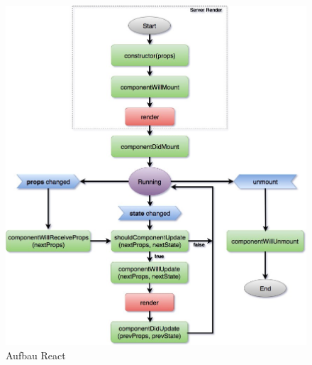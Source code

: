 \begin{figure}[ht]
	\centering
	\includegraphics[height=0.60\textheight, keepaspectratio]{img/client/Lifecycle.jpeg}
	\captionsetup{justification=centering, format=plain}
	\caption[Aufbau React]{Aufbau React \\ \quelle \cite{reactLifeCycle}}
	\label{fig:ReactLifecylce}
\end{figure}
